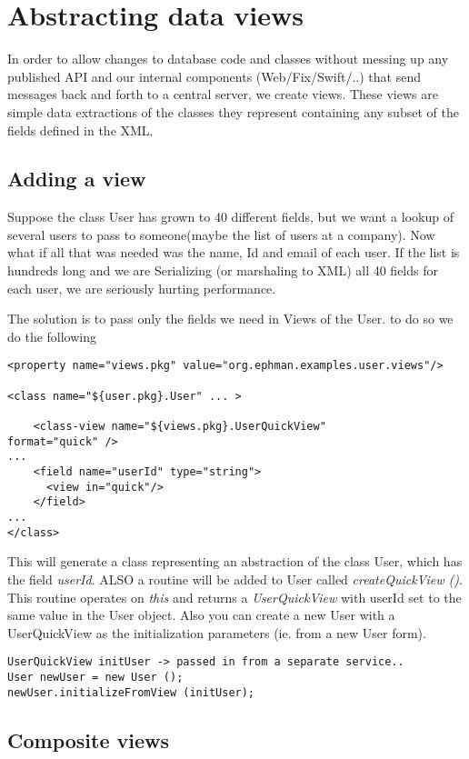\documentclass[10pt,openany]{book}
\begin{document}
\section{Abstracting data views}
In order to allow changes to database code and classes without messing
up any published API and our internal components (Web/Fix/Swift/..) that send
messages back and forth to a central server, we create views.  These views are
simple data extractions of the classes they represent containing any
subset of the fields defined in the XML.
\subsection{Adding a view}
Suppose the class User has grown to 40 different fields, but we want a
lookup of several users to pass to someone(maybe the list of users at
a company).  Now what if all that was needed was the name, Id and
email of each user.  If the list is hundreds long and we are
Serializing (or marshaling to XML) all 40 fields for each user, we
are seriously hurting performance.


The solution is to pass only the fields we need in Views of the User.
to do so we do the following

\begin{verbatim}
<property name="views.pkg" value="org.ephman.examples.user.views"/>

<class name="${user.pkg}.User" ... >

    <class-view name="${views.pkg}.UserQuickView"
format="quick" />
...
    <field name="userId" type="string">
      <view in="quick"/>
    </field>
...
</class>
\end{verbatim}
This will generate a class representing an abstraction of the class
User, which has the field \emph{userId}.  ALSO a routine
will be added to User called \textit{createQuickView ()}. This routine
operates on \textit{this} and returns a \textit{UserQuickView} with
userId set to the same value in the User object.  Also you can create
a new User with a UserQuickView as the initialization parameters
(ie. from a new User form).
\begin{verbatim}
UserQuickView initUser -> passed in from a separate service..
User newUser = new User ();
newUser.initializeFromView (initUser);
\end{verbatim}
\subsection{Composite views}
\end{document}
